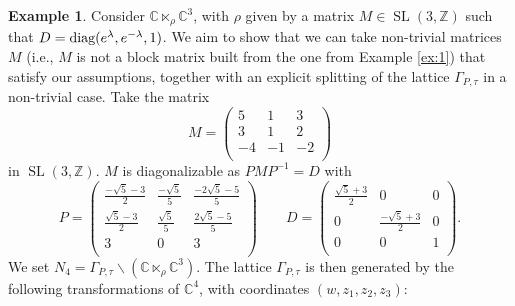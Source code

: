 \documentclass[a4paper, 11pt]{amsart}
\theoremstyle{plain}
\theoremstyle{definition}
\newtheorem{esempio}{Example}[section]
\DeclareMathOperator{\SL}{SL}
\newcommand{\C}{\mathbb{C}}
\numberwithin{equation}{section}
\begin{document}
\begin{esempio}\label{ex:2}
    Consider $\C \ltimes_{\rho} \C^{3}$, with $\rho$ given by a matrix $M \in \SL(3, \mathbb{Z})$ such that $D = \hbox{diag}(e^{\lambda}, e^{-\lambda}, 1)$. We aim to show that we can take non-trivial matrices $M$ (i.e., $M$ is not a block matrix built from the one from Example \ref{ex:1}) that satisfy our assumptions, together with an explicit splitting of the lattice $\Gamma_{P, \tau}$ in a non-trivial case. Take the matrix 
    \[M = \begin{pmatrix}
            5 & 1 & 3 \\
            3 & 1 & 2 \\
            -4 & -1 & -2 \\
    \end{pmatrix}\]
    in $\SL(3, \mathbb{Z})$. $M$ is diagonalizable as $PMP^{-1} = D$ with
    \[P = \begin{pmatrix}
            \frac{-\sqrt{5}-3}{2} & \frac{-\sqrt{5}}{5} & \frac{-2\sqrt{5}-5}{5} \\
            \frac{\sqrt{5}-3}{2} & \frac{\sqrt{5}}{5}& \frac{2\sqrt{5}-5}{5}\\
            3 & 0 & 3 \\
    \end{pmatrix} \qquad D = \begin{pmatrix}
            \frac{\sqrt{5}+3}{2} & 0 & 0 \\
            0 & \frac{-\sqrt{5}+3}{2} & 0 \\
            0 & 0 & 1 \\
    \end{pmatrix}.\]
    We set $N_{4} = \Gamma_{P, \tau} \backslash (\mathbb{C} \ltimes_{\rho} \mathbb{C}^{3})$. The lattice $\Gamma_{P, \tau}$ is then generated by the following transformations of $\C^{4}$, with coordinates $(w, z_{1}, z_{2}, z_{3})$:


\end{esempio}
\end{document}
